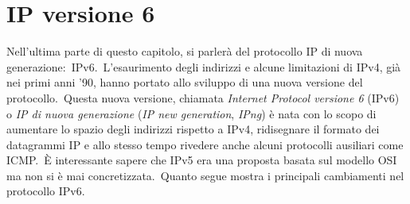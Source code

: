 \section{IP versione 6}

Nell'ultima parte di questo capitolo, si parlerà del protocollo IP di nuova generazione:\ IPv6.\
L'esaurimento degli indirizzi e alcune limitazioni di IPv4, già nei primi anni '90, hanno portato allo sviluppo di una nuova versione del protocollo.\
Questa nuova versione, chiamata \emph{Internet Protocol versione 6} (IPv6) o \emph{IP di nuova generazione} (\emph{IP new generation}, \emph{IPng}) è nata con lo scopo di aumentare lo spazio degli indirizzi rispetto a IPv4, ridisegnare il formato dei datagrammi IP e allo stesso tempo rivedere anche alcuni protocolli ausiliari come ICMP.\
È interessante sapere che IPv5 era una proposta basata sul modello OSI ma non si è mai concretizzata.\
Quanto segue mostra i principali cambiamenti nel protocollo IPv6.

